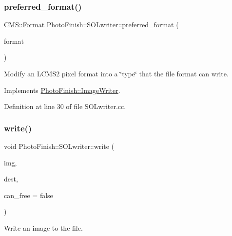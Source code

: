 \subsubsection{\texorpdfstring{preferred\+\_\+format()}{preferred\_format()}}
{\footnotesize\ttfamily \hyperlink{class_c_m_s_1_1_format}{C\+M\+S\+::\+Format} Photo\+Finish\+::\+S\+O\+Lwriter\+::preferred\+\_\+format (\begin{DoxyParamCaption}\item[{\hyperlink{class_c_m_s_1_1_format}{C\+M\+S\+::\+Format}}]{format }\end{DoxyParamCaption})\hspace{0.3cm}{\ttfamily [virtual]}}



Modify an L\+C\+M\+S2 pixel format into a \char`\"{}type\char`\"{} that the file format can write. 



Implements \hyperlink{class_photo_finish_1_1_image_writer_a83441e9a01ad47b3bb0e5efb1c751770}{Photo\+Finish\+::\+Image\+Writer}.



Definition at line 30 of file S\+O\+Lwriter.\+cc.

\mbox{\label{class_photo_finish_1_1_s_o_lwriter_a5e77af019b22c00ed97e42f531932677}} 
\subsubsection{\texorpdfstring{write()}{write()}}
{\footnotesize\ttfamily void Photo\+Finish\+::\+S\+O\+Lwriter\+::write (\begin{DoxyParamCaption}\item[{\hyperlink{class_photo_finish_1_1_image_ab336203305ed3a1397d7245063353b5a}{Image\+::ptr}}]{img,  }\item[{\hyperlink{class_photo_finish_1_1_destination_a0d282a905cd81c3f0e6d7233c9bc7774}{Destination\+::ptr}}]{dest,  }\item[{bool}]{can\+\_\+free = {\ttfamily false} }\end{DoxyParamCaption})\hspace{0.3cm}{\ttfamily [virtual]}}



Write an image to the file. 


